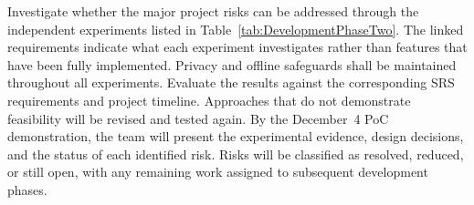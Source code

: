 \documentclass[10pt]{article}
\begin{document}
Investigate whether the major project risks can be addressed
through the independent experiments listed in
Table~\ref{tab:DevelopmentPhaseTwo}. The linked requirements
indicate what each experiment investigates rather than
features that have been fully implemented. Privacy and
offline safeguards shall be maintained throughout all
experiments. Evaluate the results against the corresponding
SRS requirements and project timeline. Approaches that do
not demonstrate feasibility will be revised and tested again.
By the December~4 PoC demonstration, the team will present
the experimental evidence, design decisions, and the status
of each identified risk. Risks will be classified as resolved,
reduced, or still open, with any remaining work assigned
to subsequent development phases.

\begingroup
\small
\renewcommand{\arraystretch}{1.15}
\end{document}
